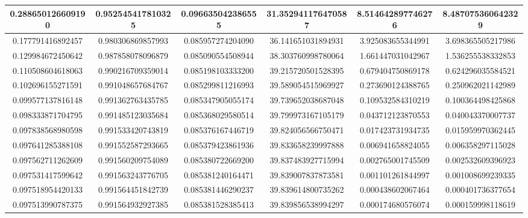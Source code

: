 \documentclass[11pt]{article}
\begin{document}
\begin{exercise}{1}
{\begin{enumerate}[label=\alph*)]
{\begin{center}
\begin{tabular}{|c|c|c|c|c|c|}
                    0.288650126609190  & 0.952545417810325  & 0.096635042386555 & 31.352941176470587  & 8.514642897746276  & 8.487075360642329 \\ \hline
                    0.177791416892457  & 0.980306869857993  & 0.085957274204090 & 36.141651031894931  & 3.925083655344991  & 3.698365505217986 \\ \hline
                    0.129984672450642  & 0.987858078096879  & 0.085090554508944 & 38.303760998780064  & 1.661447031042967  & 1.536255538332853 \\ \hline
                    0.110508604618063  & 0.990216709359014  & 0.085198103333200 & 39.215720501528395  & 0.679404750869178  & 0.624296035584521 \\ \hline
                    0.102696155271591  & 0.991048657684767  & 0.085299811216993 & 39.589054515969927  & 0.273690124388765  & 0.250962021142989 \\ \hline
                    0.099577137816148  & 0.991362763435785  & 0.085347905055174 & 39.739652038687048  & 0.109532584310219  & 0.100364498425868 \\ \hline
                    0.098333871704795  & 0.991485123035684  & 0.085368029580514 & 39.799973167105179  & 0.043712123870553  & 0.040043370007737 \\ \hline
                    0.097838568980598  & 0.991533420743819  & 0.085376167446719 & 39.824056566750471  & 0.017423731934735  & 0.015959970362445 \\ \hline
                    0.097641285388108  & 0.991552587293665  & 0.085379423861936 & 39.833658239997888  & 0.006941658824055  & 0.006358297115028 \\ \hline
                    0.097562711262609  & 0.991560209754089  & 0.085380722669200 & 39.837483927715994  & 0.002765001745509  & 0.002532609396923 \\ \hline
                    0.097531417599642  & 0.991563243776705  & 0.085381240164471 & 39.839007837873581  & 0.001101261844997  & 0.001008699239335 \\ \hline
                    0.097518954420133  & 0.991564451842739  & 0.085381446290237 & 39.839614800735262  & 0.000438602067464  & 0.000401736377654 \\ \hline
                    0.097513990787375  & 0.991564932927385  & 0.085381528385413 & 39.839856538994297  & 0.000174680576074  & 0.000159998118619 \\ \hline
                \end{tabular}
            \end{center}
}
\end{enumerate}}
\end{exercise}
\end{document}
